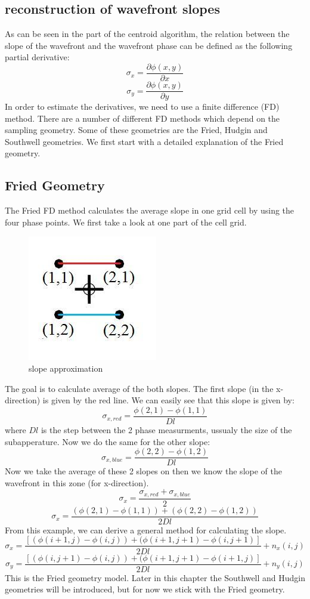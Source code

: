 \documentclass{article}
\begin{document}
\subsection{reconstruction of wavefront slopes}
As can be seen in the part of the centroid algorithm, the relation between the slope of the wavefront and the wavefront phase can be defined as the following partial derivative:
$$ \sigma_x = \frac{\partial\phi(x,y)}{\partial x}$$ 
$$ \sigma_y = \frac{\partial\phi(x,y)}{\partial y}$$ 
In order to estimate the derivatives, we need to use a finite difference (FD) method. There are a number of different FD methods which depend on the sampling geometry. Some of these geometries are the Fried, Hudgin and Southwell geometries. We first start with a detailed explanation of the Fried geometry.

\subsection{Fried Geometry}
The Fried FD method calculates the average slope in one grid cell by using the four phase points. We first take a look at one part of the cell grid.
\begin{figure}[h!]
  \centering
  \includegraphics[scale=0.6]{figures/fried}
  \caption{slope approximation}
\end{figure}
\newpage
\noindent The goal is to calculate average of the both slopes. The first slope (in the x-direction) is given by the red line. We can easily see that this slope is given by:
$$ \sigma_{x,red} = \frac{\phi(2,1) - \phi(1,1)}{Dl} $$
where $Dl$ is the step between the 2 phase measurments, ussualy the size of the subapperature.
Now we do the same for the other slope:
$$ \sigma_{x,blue} = \frac{\phi(2,2) - \phi(1,2)}{Dl} $$
Now we take the average of these 2 slopes on then we know the slope of the wavefront in this zone (for x-direction).
$$ \sigma_x = \frac{\sigma_{x,red}+\sigma_{x,blue}}{2}$$
$$ \sigma_x = \frac{(\phi(2,1) - \phi(1,1))+(\phi(2,2) - \phi(1,2))}{2Dl}$$
From this example, we can derive a general method for calculating the slope. 
$$ \sigma_x = \frac{[(\phi(i+1,j)-\phi(i,j))+(\phi(i+1,j+1)-\phi(i,j+1)]}{2Dl} + n_x(i,j)$$
$$ \sigma_y = \frac{[(\phi(i,j+1)-\phi(i,j))+(\phi(i+1,j+1)-\phi(i+1,j)]}{2Dl} + n_y(i,j)$$
This is the Fried geometry model. Later in this chapter the Southwell and Hudgin geometries will be introduced, but for now we stick with the Fried geometry.  
\end{document}
